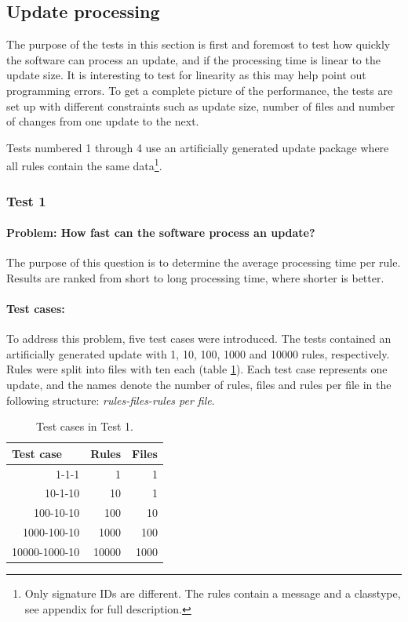 \subsection{Update processing}
The purpose of the tests in this section is first and foremost to test how
quickly the software can process an update, and if the processing time is
linear to the update size. It is interesting to test for linearity as this may
help point out programming errors. To get a complete picture of the
performance, the tests are set up with different constraints such as update
size, number of files and number of changes from one update to the next.

Tests numbered 1 through 4 use an artificially generated update package where
all rules contain the same data\footnote{Only signature IDs are different. The
rules contain a message and a classtype, see appendix for full description.}. 

\subsubsection{Test 1}
\paragraph{Problem: How fast can the software process an update?}
The purpose of this question is to determine the average
processing time per rule. Results are ranked from short to long
processing time, where shorter is better.
\paragraph{Test cases:}
To address this problem, five test cases were introduced. The tests contained
an artificially generated update with 1, 10, 100, 1000 and 10000 rules,
respectively. Rules were split into files with ten each (table
\ref{tab:test1Names}). Each test case represents one update, and the names
denote the number of rules, files and rules per file in the following structure:
\textit{rules-files-rules per file}.

\renewcommand{\arraystretch}{1.5}

\begin{table}[h!]
  \centering
  \begin{tabular}{r|r|r}
  	\multicolumn{1}{l|}{Test case} & \multicolumn{1}{l|}{Rules} &
  	\multicolumn{1}{l}{Files} \\
	\hline
	1-1-1 & 1 & 1 \\
	10-1-10 & 10 & 1 \\
	100-10-10 & 100 & 10 \\
	1000-100-10 & 1000 & 100 \\
	10000-1000-10 & 10000 & 1000 \\
	\hline
  \end{tabular}
  \caption{Test cases in Test 1.}
  \label{tab:test1Names}
\end{table}

